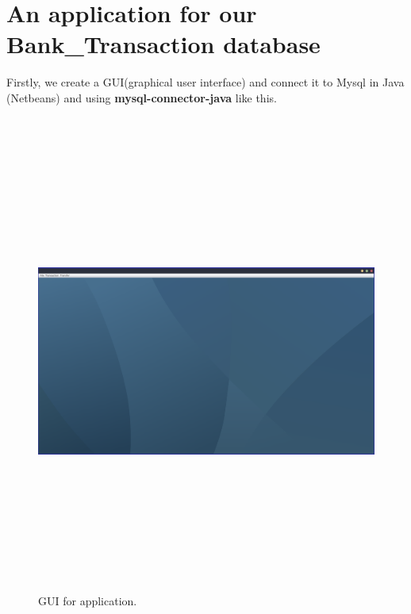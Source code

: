 \documentclass[12pt,a4paper]{article}
\begin{document}
\newpage
\section{An application for our Bank\_Transaction database}
\indent Firstly, we create a GUI(graphical user interface) and connect it to Mysql in Java (Netbeans) and using \textbf{mysql-connector-java} like this.\\\\

 \begin{figure}[H]
        \centering
        \includegraphics[width=6in,height=6in]{Picture/app1.png}
        \caption{GUI for application.}
\end{figure}
\end{document}
